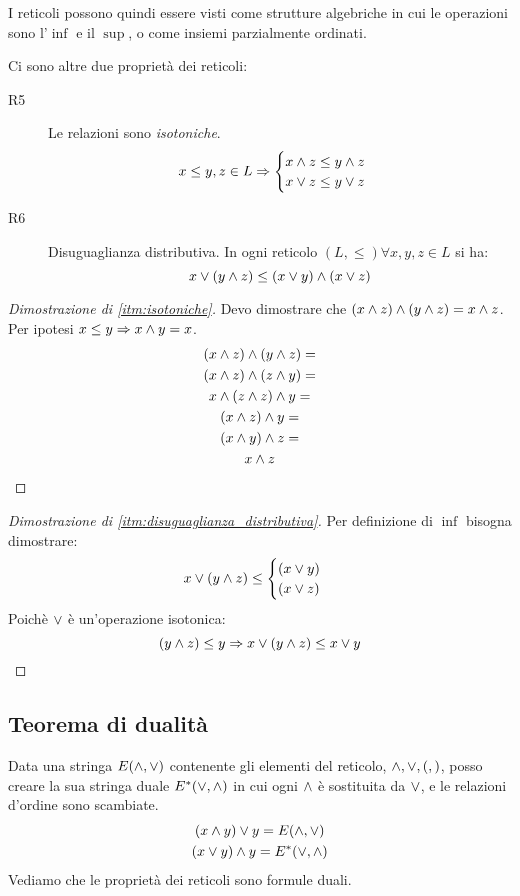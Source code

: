 I reticoli possono quindi essere visti come strutture algebriche in cui le operazioni sono l'$\inf$ e il $\sup$, o come insiemi parzialmente ordinati.

Ci sono altre due propriet\`a dei reticoli:
\begin{description}
  \item [R5\label{itm:isotoniche}] Le relazioni sono \textit{isotoniche}.
  \[
  x \le y, z \in L \Rightarrow 
  \begin{cases}
  x \wedge z \le y \wedge z \\ 
  x \vee z \le y \vee z
  \end{cases}
  \]
  \item [R6\label{itm:disuguaglianza_distributiva}] Disuguaglianza distributiva. In ogni reticolo $(L, \le) \forall x, y, z \in L $ si ha:
  \[
  x \vee (y \wedge z) \le (x \vee y) \wedge (x \vee z)
  \]
\end{description}

\begin{proof}[Dimostrazione di \ref{itm:isotoniche}]
Devo dimostrare che $ (x \wedge z) \wedge (y \wedge z) = x \wedge z $.
Per ipotesi $x \le y \Rightarrow x \wedge y = x$.
\begin{multline*}
(x \wedge z) \wedge (y \wedge z) = \\
(x \wedge z) \wedge (z \wedge y) = \\
x \wedge (z \wedge z) \wedge y = \\
(x \wedge z) \wedge y = \\
(x \wedge y) \wedge z = \\
 x \wedge z
\end{multline*}
\end{proof}
\begin{proof}[Dimostrazione di \ref{itm:disuguaglianza_distributiva}]
Per definizione di $\inf$ bisogna dimostrare:
\[
x \vee (y \wedge z) \le 
\begin{cases}
(x \vee y) \\
(x \vee z)
\end{cases}
\]
Poich\`e $\vee$ \`e un'operazione isotonica:
\[
(y \wedge z) \le y \Rightarrow x \vee (y \wedge z) \le x \vee y
\]
\end{proof}

\subsection{Teorema di dualit\`a}
Data una stringa $E(\wedge, \vee)$ contenente gli elementi del reticolo, $\wedge, \vee, (, )$, posso creare la sua stringa duale $E^{\ast} (\vee, \wedge)$ in cui ogni $\wedge$ \`e sostituita da $\vee$, e le relazioni d'ordine sono scambiate.
\begin{gather*}
(x \wedge y) \vee y = E(\wedge, \vee) \\
(x \vee y) \wedge y = E^{\ast} (\vee, \wedge)
\end{gather*}
Vediamo che le propriet\`a dei reticoli sono formule duali.

